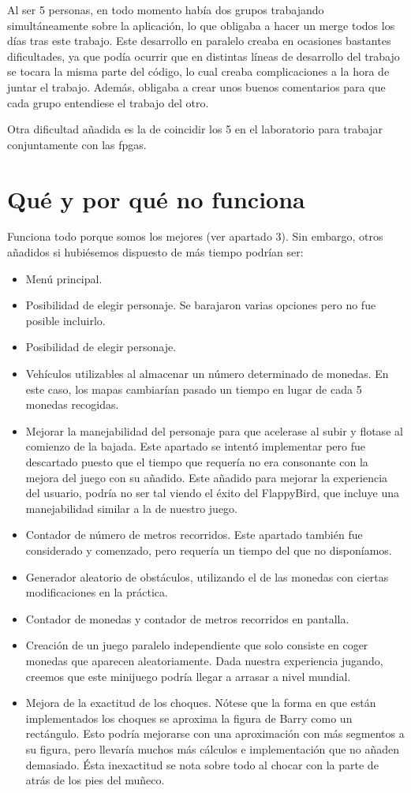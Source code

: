 \documentclass[11pt, a4paper, spanish, openright, twoside]{book}
\begin{document}
Al ser 5 personas, en todo momento había dos grupos trabajando simultáneamente sobre la aplicación, lo que obligaba a hacer un merge todos los días tras este trabajo. Este desarrollo en paralelo
creaba en ocasiones bastantes dificultades, ya que podía ocurrir que en distintas líneas de desarrollo del trabajo se tocara la misma parte del código,  lo cual creaba complicaciones a la hora de juntar el trabajo. Además, 
obligaba a crear unos buenos comentarios para que cada grupo entendiese el trabajo del otro. 

Otra dificultad añadida es la de coincidir los 5  en el laboratorio para trabajar conjuntamente con las fpgas.

\section{Qué y por qué no funciona}
Funciona todo porque somos los mejores (ver apartado 3). Sin embargo, otros añadidos si hubiésemos dispuesto de más tiempo podrían ser:
	
\begin{itemize}
	\item Menú principal.
	\item Posibilidad de elegir personaje. Se barajaron varias opciones pero no fue posible incluirlo.
	\item Posibilidad de elegir personaje.
	\item Vehículos utilizables al almacenar un número determinado de monedas. En este caso, los mapas cambiarían pasado un tiempo en lugar de cada 5 monedas recogidas.
	\item Mejorar la  manejabilidad del personaje para que acelerase al subir y flotase al comienzo de la bajada. 
	Este apartado se intentó implementar pero fue descartado puesto que el tiempo que requería no era consonante con la mejora del juego con su añadido.
	Este añadido  para mejorar la experiencia del usuario, podría no ser tal viendo el éxito del FlappyBird, que incluye una manejabilidad similar a la de nuestro juego.
	\item Contador de número de metros recorridos. Este apartado también fue considerado y comenzado, pero requería un tiempo del que no disponíamos.
	\item Generador aleatorio de obstáculos, utilizando el de las monedas con ciertas modificaciones en la práctica.
	\item Contador de monedas y contador de metros recorridos en pantalla.
	\item Creación de un juego paralelo independiente que solo consiste en coger monedas que aparecen aleatoriamente. Dada nuestra experiencia jugando, creemos que este minijuego podría llegar a arrasar a nivel mundial.
		\item Mejora de la exactitud de los choques.
		Nótese que la forma en que están implementados los 
		choques se aproxima la figura de Barry como un rectángulo.
		Esto podría mejorarse con una aproximación con más segmentos a su figura, pero llevaría muchos más cálculos e implementación que no añaden demasiado. Ésta inexactitud se nota sobre todo al chocar 
		con la parte de atrás de los pies del muñeco.
\end{itemize}
\end{document}
